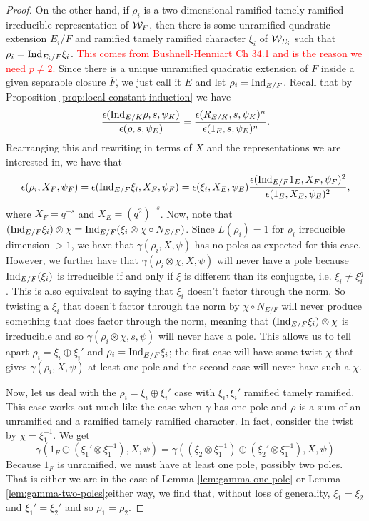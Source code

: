 \begin{proof}
  On the other hand, if $\rho_i$ is a two dimensional ramified tamely ramified irreducible representation of $\mathcal{W}_F$, then there is some unramified quadratic extension $E_i/F$ and ramified tamely ramified character $\xi_i$ of $\mathcal{W}_{E_i}$ such that $\rho_i = \textrm{Ind}_{E_i/F} \xi_i$.
  \textcolor{red}{This comes from Bushnell-Henniart Ch 34.1 and is the reason we need $p\neq 2$.}
  Since there is a unique unramified quadratic extension of $F$ inside a given separable closure $\overline{F}$, we just call it $E$ and let $\rho_i = \textrm{Ind}_{E/F}$.
  Recall that by Proposition \ref{prop:local-constant-induction} we have
  \[\frac{\epsilon(\textrm{Ind}_{E/K} \rho, s, \psi_K)}{\epsilon(\rho,s,\psi_E)} = \frac{\epsilon(R_{E/K},s,\psi_K)^n}{\epsilon(1_E,s,\psi_E)^n}.\]
  Rearranging this and rewriting in terms of $X$ and the representations we are interested in, we have that
  \[\epsilon(\rho_i,X_F,\psi_F) = \epsilon(\textrm{Ind}_{E/F} \xi_i, X_F, \psi_F) = \epsilon(\xi_i, X_E, \psi_E) \frac{\epsilon(\textrm{Ind}_{E/F} 1_E,X_F,\psi_F)^2}{\epsilon(1_E,X_E,\psi_E)^2},\]
  where $X_F = q^{-s}$ and $X_E = (q^2)^{-s}$.
  Now, note that $(\textrm{Ind}_{E/F} \xi_i )\otimes \chi = \textrm{Ind}_{E/F} (\xi_i \otimes \chi \circ N_{E/F})$.
  Since $L(\rho_i) = 1$ for $\rho_i$ irreducible dimension $ > 1$, we have that $\gamma(\rho_i,X,\psi)$ has no poles as expected for this case.
  However, we further have that $\gamma(\rho_i \otimes \chi,X,\psi)$ will never have a pole because $\textrm{Ind}_{E/F} (\xi_i)$ is irreducible if and only if $\xi$ is different than its conjugate, i.e.  $\xi_i \neq \xi_i^{q}$.
  This is also equivalent to saying that $\xi_i$ doesn't factor through the norm.
  So twisting a $\xi_i$ that doesn't factor through the norm by $\chi \circ N_{E/F}$ will never produce something that does factor through the norm, meaning that $(\textrm{Ind}_{E/F} \xi_i )\otimes \chi$ is irreducible and so $\gamma(\rho_i \otimes \chi, s, \psi)$ will never have a pole.
  This allows us to tell apart $\rho_i = \xi_i \oplus \xi_i'$ and $\rho_i = \textrm{Ind}_{E/F} \xi_i$; the first case will have some twist $\chi$ that gives $\gamma(\rho_i,X,\psi)$ at least one pole and the second case will never have such a $\chi$.

  
  Now, let us deal with the $\rho_i = \xi_i \oplus \xi_i'$ case with $\xi_i, \xi_i'$ ramified tamely ramified.
  This case works out much like the case when $\gamma$ has one pole and $\rho$ is a sum of an unramified and a ramified tamely ramified character.
  In fact, consider the twist by $\chi = \xi_1^{-1}$.
  We get \[\gamma(1_F \oplus (\xi_1' \otimes \xi_1^{-1}),X,\psi) = \gamma((\xi_2 \otimes \xi_1^{-1})\oplus(\xi_2' \otimes \xi_1^{-1}),X,\psi)\]
  Because $1_F$ is unramified, we must have at least one pole, possibly two poles.
  That is either we are in the case of Lemma \ref{lem:gamma-one-pole} or Lemma \ref{lem:gamma-two-poles};either way, we find that, without loss of generality, $\xi_1 = \xi_2$ and $\xi_1' = \xi_2'$ and so $\rho_1 = \rho_2$.
  

\end{proof}
